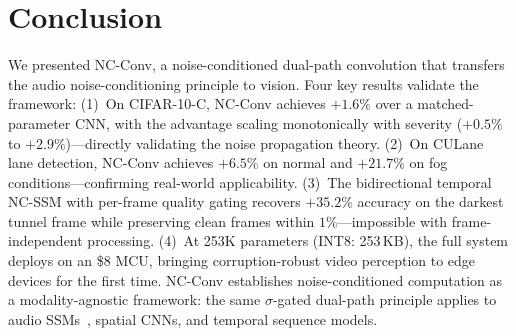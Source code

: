 \documentclass[10pt,twocolumn,letterpaper]{article}
\begin{document}
\section{Conclusion}

We presented NC-Conv, a noise-conditioned dual-path convolution that transfers the audio noise-conditioning principle to vision.
Four key results validate the framework:
(1)~On CIFAR-10-C, NC-Conv achieves $+1.6\%$ over a matched-parameter CNN, with the advantage scaling monotonically with severity ($+0.5\%$ to $+2.9\%$)---directly validating the noise propagation theory.
(2)~On CULane lane detection, NC-Conv achieves $+6.5\%$ on normal and $+21.7\%$ on fog conditions---confirming real-world applicability.
(3)~The bidirectional temporal NC-SSM with per-frame quality gating recovers $+35.2\%$ accuracy on the darkest tunnel frame while preserving clean frames within $1\%$---impossible with frame-independent processing.
(4)~At 253K parameters (INT8: 253\,KB), the full system deploys on an \$8 MCU, bringing corruption-robust video perception to edge devices for the first time.
NC-Conv establishes noise-conditioned computation as a modality-agnostic framework: the same $\sigma$-gated dual-path principle applies to audio SSMs~\cite{choi2026ncssm}, spatial CNNs, and temporal sequence models.

{\small


}
\end{document}
